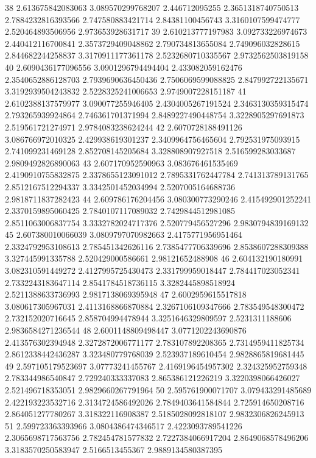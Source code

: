 38 2.613675842083063 3.089570299768207 2.446712095255 2.3651318740750513 2.7884232816393566 2.747580883421714 2.84381100456743 3.3160107599474777 2.520464893506956 2.973653928631717
39 2.610213777197983 3.092733226974673 2.440412116700841 2.3573729409048862 2.790734813655084 2.749096032828615 2.844682244258837 3.3170911177361178 2.5232680710335567 2.9732562503819158
40 2.6090436177096556 3.0901296794494404 2.433082059162476 2.3540652886128703 2.7939690636450436 2.7506069599088825 2.847992722135671 3.3192939504243832 2.5228325241006653 2.9749007228151187
41 2.6102388137579977 3.090077255946405 2.4304005267191524 2.3463130359315474 2.793265939924864 2.746361701371994 2.8489227490448754 3.3228905297691873 2.519561721274971 2.9784083238624244
42 2.6070728188491126 3.086766972010325 2.429938619301237 2.3409964756465604 2.792531975093915 2.741099231469128 2.852708145205684 3.328808907927518 2.516599283033687 2.9809492826890063
43 2.607170952590963 3.083676461535469 2.4190910755832875 2.3378655123091012 2.7895331762447784 2.741313789131765 2.8512167512294337 3.3342501452034994 2.5207005164688736 2.9818711837282423
44 2.609786176204456 3.080300773290246 2.415492901252241 2.3370159895060425 2.7840107117089032 2.7429844512981085 2.8511063006837754 3.3332782024717376 2.520779456527296 2.9830794839169132
45 2.607380010066039 3.0809797070982663 2.4175771956951464 2.3324792953108613 2.785451342626116 2.7385477706339696 2.8538607288309388 3.327445991335788 2.520429000586661 2.98121652488908
46 2.604132190180991 3.082310591449272 2.4127995725430473 2.331799959018447 2.784417023052341 2.7332243183647114 2.8541784518736115 3.3282445898518924 2.5211388633736993 2.9817138069395948
47 2.6002959615517818 3.080617305967031 2.4113168866870884 2.3267106109347666 2.783549548300472 2.732152020716645 2.858704994478944 3.3251646329809597 2.5231311188606 2.9836584271236544
48 2.6001148809498447 3.0771202243690876 2.413576302394948 2.3272872006771177 2.783107892208365 2.7314959411825734 2.8612338442436287 3.323480779768039 2.523937189610454 2.9828865819681445
49 2.597105179523697 3.07773241455767 2.4169196454957302 2.324325952759348 2.783344986540847 2.729240333337083 2.865386121226219 3.3220398066426027 2.521496718353051 2.9829660267791964
50 2.595761900071707 3.079433291485689 2.422193223532716 2.3134724586492026 2.7849403641584844 2.725914650208716 2.864051277780267 3.318322116908387 2.5185028092818107 2.9832306826245913
51 2.599723363393966 3.0804386474346517 2.4223093789541226 2.3065698717563756 2.782454781577832 2.7227384066917204 2.8649068578496206 3.3183570250583947 2.5166513455367 2.9889134580387395
